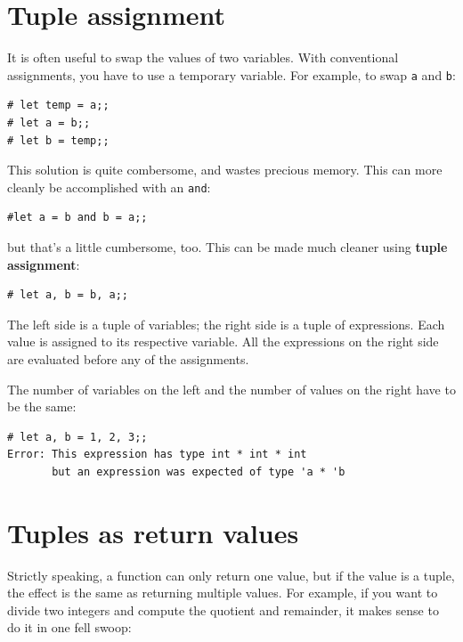 \documentclass[10pt]{book}
\begin{document}
{\section{Tuple assignment}
\label{tuple assignment}


It is often useful to swap the values of two variables.
With conventional assignments, you have to use a temporary
variable.  For example, to swap {\tt a} and {\tt b}:

\beforeverb
\begin{verbatim}
# let temp = a;;
# let a = b;;
# let b = temp;;
\end{verbatim}
\afterverb
%
This solution is quite combersome, and wastes precious memory. This can more cleanly be accomplished with an {\tt and}:

\beforeverb
\begin{verbatim}
#let a = b and b = a;;
\end{verbatim}
\afterverb

but that's a little cumbersome, too. This can be made much cleaner using {\bf tuple assignment}:

\beforeverb
\begin{verbatim}
# let a, b = b, a;;
\end{verbatim}
\afterverb
%
The left side is a tuple of variables; the right side is a tuple of
expressions.  Each value is assigned to its respective variable.  
All the expressions on the right side are evaluated before any
of the assignments.

The number of variables on the left and the number of
values on the right have to be the same:


\beforeverb
\begin{verbatim}
# let a, b = 1, 2, 3;;
Error: This expression has type int * int * int
       but an expression was expected of type 'a * 'b
\end{verbatim}
\afterverb
%

\section{Tuples as return values}


Strictly speaking, a function can only return one value, but
if the value is a tuple, the effect is the same as returning
multiple values.  For example, if you want to divide two integers
and compute the quotient and remainder, it makes sense to do it in 
one fell swoop:

}
\end{document}
